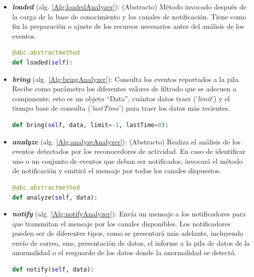 \begin{itemize}
            \item \textbf{\textit{loaded}} (alg. \ref{Alg:loadedAnalyzer}):
            (Abstracto) Método invocado después de la carga de la base de conocimiento y los canales de notificación. Tiene como fin la preparación o ajuste de los recursos necesarios antes del análisis de los eventos.
            \begin{lstlisting}[language=Python, caption={Firma del método ``\textit{loaded}'' de la clase EventAnalyzer.}, label=Alg:loadedAnalyzer, numbers=none]
@abc.abstractmethod
def loaded(self):
            \end{lstlisting}
            
            \item \textbf{\textit{bring}} (alg. \ref{Alg:bringAnalyzer}):
            Consulta los eventos reportados a la pila. Recibe como parámetro los diferentes valores de filtrado que se adecuen a componente, esto es un objeto ``Data'', cuántos datos traer ('\textit{limit}') y el tiempo base de consulta ('\textit{lastTime}') para traer los datos más recientes.
            \begin{lstlisting}[language=Python, caption={Firma del método "\textit{bring}" de la clase EventAnalyzer.}, label=Alg:bringAnalyzer, numbers=none]
def bring(self, data, limit=-1, lastTime=0):
            \end{lstlisting}
            
            \item \textbf{\textit{analyze}} (alg. \ref{Alg:analyzeAnalyzer}):
            (Abstracto) Realiza el análisis de los eventos detectados por los reconocedores de actividad. En caso de identificar uno o un conjunto de eventos que deban ser notificados, invocará el método de notificación y emitirá el mensaje por todos los canales dispuestos.
            \begin{lstlisting}[language=Python, caption={Firma del método "\textit{analyze}" de la clase EventAnalyzer.}, label=Alg:analyzeAnalyzer, numbers=none]
@abc.abstractmethod
def analyze(self, data):
            \end{lstlisting}
            
            \item \textbf{\textit{notify}} (alg. \ref{Alg:notifyAnalyzer}):
            Envía un mensaje a los notificadores para que transmitan el mensaje por los canales disponibles. Los notificadores pueden ser de diferentes tipos, como se presentará más adelante, incluyendo envío de correo, sms, presentación de datos, el informe a la pila de datos de la anormalidad o el resguardo de los datos donde la anormalidad se detectó.
            \begin{lstlisting}[language=Python, caption={Firma del método "\textit{notify}" de la clase EventAnalyzer.}, label=Alg:notifyAnalyzer, numbers=none]
def notify(self, data):
            \end{lstlisting}
            

\end{itemize}

